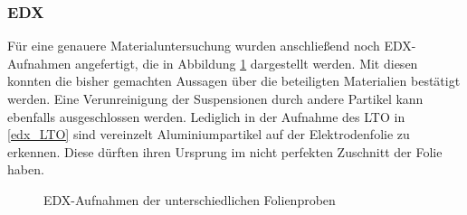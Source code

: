 \documentclass[a4paper, 11pt, headsepline,footsepline,twoside,abstract]{scrbook}
\begin{document}
\subsubsection{EDX}
Für eine genauere Materialuntersuchung wurden anschließend noch EDX-Aufnahmen angefertigt, die in Abbildung \ref{edx_gesamt} dargestellt werden. Mit diesen konnten die bisher gemachten Aussagen über die beteiligten Materialien bestätigt werden. Eine Verunreinigung der Suspensionen durch andere Partikel kann ebenfalls ausgeschlossen werden. Lediglich in der Aufnahme des LTO in \ref{edx_LTO} sind vereinzelt Aluminiumpartikel auf der Elektrodenfolie zu erkennen. Diese dürften ihren Ursprung im nicht perfekten Zuschnitt der Folie haben.
\begin{figure}
   \centering
       \vspace{3mm}
       \vspace{3mm}
       \vspace{3mm}
       \vspace{3mm}
	\caption{EDX-Aufnahmen der unterschiedlichen Folienproben}
   	\label{edx_gesamt}
\end{figure}
\end{document}
